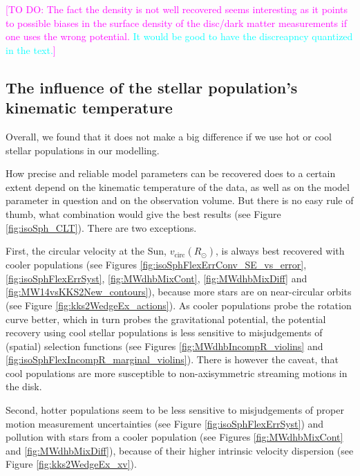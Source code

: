 \documentclass[iop,revtex4]{emulateapj}
\newcommand{\HW}[1]{\textcolor{Cyan}{#1}}
\newcommand{\Wilma}[1]{\textcolor{Magenta}{#1}}
\begin{document}
\Wilma{[TO DO: The fact the density is not well recovered seems interesting as it points to possible biases in the surface density of the disc/dark matter measurements if one uses the wrong potential. \HW{It would be good to have the discreapncy quantized in the text.}]}

\subsection{The influence of the stellar population's kinematic temperature} \label{sec:results_temperature}

Overall, we found that it does not make a big difference if we use hot or cool stellar populations in our modelling.

How precise and reliable model parameters can be recovered does to a certain extent depend on the kinematic temperature of the data, as well as on the model parameter in question and on the observation volume. But there is no easy rule of thumb, what combination would give the best results (see Figure \ref{fig:isoSph_CLT}). There are two exceptions.

First, the circular velocity at the Sun, $v_\text{circ}(R_\odot)$, is always best recovered with cooler populations (see Figures \ref{fig:isoSphFlexErrConv_SE_vs_error}, \ref{fig:isoSphFlexErrSyst}, \ref{fig:MWdhbMixCont}, \ref{fig:MWdhbMixDiff} and \ref{fig:MW14vsKKS2New_contours}), because more stars are on near-circular orbits (see Figure \ref{fig:kks2WedgeEx_actions}). As cooler populations probe the rotation curve better, which in turn probes the gravitational potential, the potential recovery using cool stellar populations is less sensitive to misjudgements of (spatial) selection functions (see Figures \ref{fig:MWdhbIncompR_violins} and \ref{fig:isoSphFlexIncompR_marginal_violins}). There is however the caveat, that cool populations are more susceptible to non-axisymmetric streaming motions in the disk.

Second, hotter populations seem to be less sensitive to misjudgements of proper motion measurement uncertainties (see Figure \ref{fig:isoSphFlexErrSyst}) and pollution with stars from a cooler population (see Figures \ref{fig:MWdhbMixCont} and \ref{fig:MWdhbMixDiff}), because of their higher intrinsic velocity dispersion (see Figure \ref{fig:kks2WedgeEx_xv}).
\end{document}
